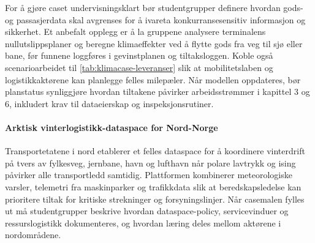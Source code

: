 For å gjøre caset undervisningsklart bør studentgrupper definere hvordan gods- og passasjerdata skal avgrenses for å ivareta konkurransesensitiv informasjon og sikkerhet. Et anbefalt opplegg er å la gruppene analysere terminalens nullutslippsplaner og beregne klimaeffekter ved å flytte gods fra veg til sjø eller bane, før funnene loggføres i gevinstplanen og tiltaksloggen. Koble også scenarioarbeidet til \autoref{tab:klimacase-leveranser} slik at mobilitetslaben og logistikkaktørene kan planlegge felles milepæler. Når modellen oppdateres, bør planstatus synliggjøre hvordan tiltakene påvirker arbeidsstrømmer i kapittel 3 og 6, inkludert krav til dataeierskap og inspeksjonsrutiner.

\paragraph{Arktisk vinterlogistikk-dataspace for Nord-Norge}
Transportetatene i nord etablerer et felles dataspace for å koordinere vinterdrift på tvers av fylkesveg, jernbane, havn og lufthavn når polare lavtrykk og ising påvirker alle transportledd samtidig.\citep{tffk2023mobilitet,avinor2023nord,banenor2023vinter,svv2023vinter} Plattformen kombinerer meteorologiske varsler, telemetri fra maskinparker og trafikkdata slik at beredskapsledelse kan prioritere tiltak for kritiske strekninger og forsyningslinjer. Når casemalen fylles ut må studentgrupper beskrive hvordan dataspace-policy, servicevinduer og ressurslogistikk dokumenteres, og hvordan læring deles mellom aktørene i nordområdene.

